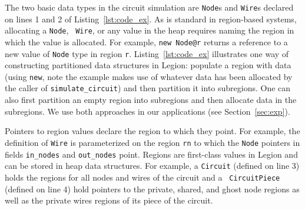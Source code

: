 

The two basic data types in the circuit simulation are {\tt Node}s and
{\tt Wire}s declared on lines 1 and 2 of Listing~\ref{lst:code_ex}.
As is standard in region-based systems, allocating a {\tt Node}, {\tt
  Wire}, or any value in the heap requires naming the region
in which the value is allocated.  For example, {\tt new Node@r} returns
a reference to a new value of {\tt Node} type in region {\tt r}.  
Listing~\ref{lst:code_ex} illustrates one way of constructing partitioned
data structures in Legion: populate a region with data (using {\tt new}, note the example
makes use of whatever data has been allocated by the caller of {\tt simulate\_circuit})
and then partition it into subregions.  One can also first partition an empty region into subregions
and then allocate data in the subregions. We use both approaches in our
applications (see Section~\ref{sec:exp}).

Pointers to region values declare the region to which they point.  For
example, the definition of {\tt Wire} is parameterized on the region
{\tt rn} to which the {\tt Node} pointers in fields {\tt in\_nodes}
and {\tt out\_nodes} point.
Regions are first-class values in Legion and can be stored in heap
data structures.  For example, a {\tt Circuit} (defined on line 3)
holds the regions for all nodes and wires of the circuit and a {\tt
  CircuitPiece} (defined on line 4) hold pointers to the private,
shared, and ghost node regions as well as the private wires regions of its piece of
the circuit.





